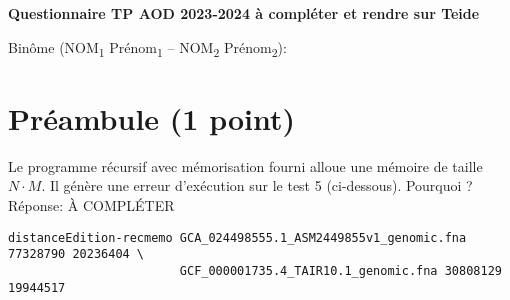 \documentclass[10pt,a4paper]{article}
\begin{document}
\thispagestyle{empty}

\noindent\centerline{\bf\large Questionnaire TP AOD 2023-2024 à compléter et rendre sur Teide}
Binôme (NOM\textsubscript{1} Prénom\textsubscript{1} -- NOM\textsubscript{2} Prénom\textsubscript{2}): \dotfill

\section{Préambule (1 point)}
Le programme récursif avec mémorisation fourni alloue une mémoire de taille $N \cdot M$. Il génère une erreur d'exécution sur le test 5 (ci-dessous). Pourquoi ?
Réponse: À COMPLÉTER
\begin{verbatim}
distanceEdition-recmemo GCA_024498555.1_ASM2449855v1_genomic.fna 77328790 20236404 \
                        GCF_000001735.4_TAIR10.1_genomic.fna 30808129 19944517
\end{verbatim}
\end{document}
